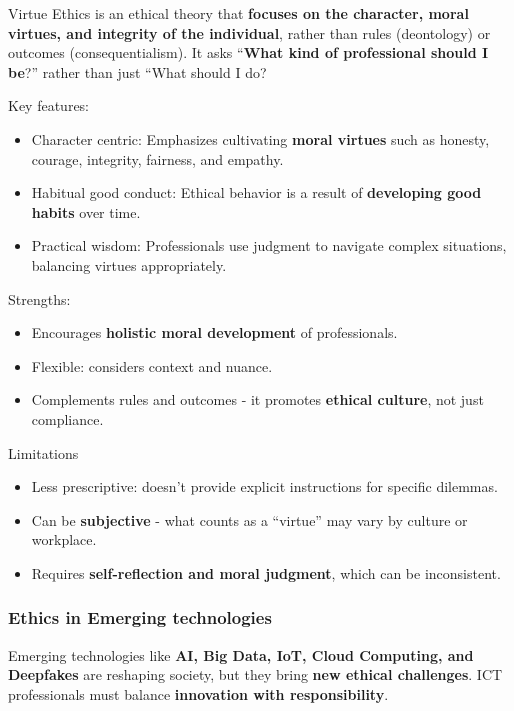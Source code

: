 Virtue Ethics is an ethical theory that \textbf{focuses on the character, moral virtues, and integrity of the individual}, rather than rules (deontology) or outcomes (consequentialism). It asks “\textbf{What kind of professional should I be}?” rather than just “What should I do?

Key features:

\begin{itemize}
    \item Character centric: Emphasizes cultivating \textbf{moral virtues} such as honesty, courage, integrity, fairness, and empathy.
    \item Habitual good conduct: Ethical behavior is a result of \textbf{developing good habits} over time.
    \item Practical wisdom: Professionals use judgment to navigate complex situations, balancing virtues appropriately.
\end{itemize}

Strengths:

\begin{itemize}
    \item Encourages \textbf{holistic moral development} of professionals.
    \item Flexible: considers context and nuance.
    \item Complements rules and outcomes - it promotes \textbf{ethical culture}, not just compliance.
\end{itemize}

Limitations

\begin{itemize}
    \item Less prescriptive: doesn’t provide explicit instructions for specific dilemmas.
    \item Can be \textbf{subjective} - what counts as a “virtue” may vary by culture or workplace.
    \item Requires \textbf{self-reflection and moral judgment}, which can be inconsistent.
\end{itemize}

\subsubsection{Ethics in Emerging technologies}

\indent 

Emerging technologies like \textbf{AI, Big Data, IoT, Cloud Computing, and Deepfakes} are reshaping society, but they bring \textbf{new ethical challenges}. ICT professionals must balance \textbf{innovation with responsibility}.

